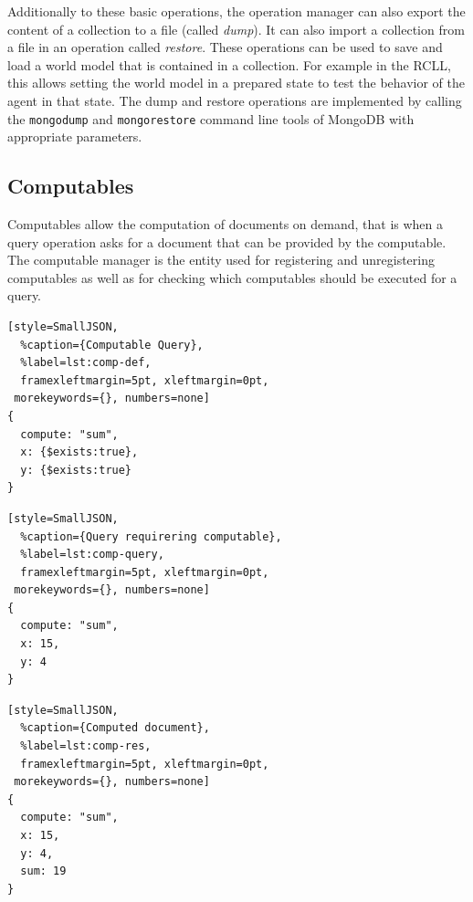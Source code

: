 Additionally to these basic operations, the operation manager can also
export the content of a collection to a file (called \emph{dump}). It
can also import a collection from a file in an operation called
\emph{restore}. These operations can be used to save and load a world
model that is contained in a collection. For example in the RCLL, this
allows setting the world model in a prepared state to test the
behavior of the agent in that state. The dump and restore operations
are implemented by calling the \texttt{mongodump} and
\texttt{mongorestore} command line tools of MongoDB with appropriate
parameters.

\subsection{Computables}
\label{sec:impl-computables}
Computables allow the computation of documents on demand, that is when
a query operation asks for a document that can be provided by the
computable. The computable manager is the entity used for registering
and unregistering computables as well as for checking which
computables should be executed for a query.\\
\begin{listing}
\addtocounter{lstlisting}{1}
\noindent
\begin{minipage}[b]{.30\textwidth}
\begin{lstlisting}[style=SmallJSON,
  %caption={Computable Query},
  %label=lst:comp-def,
  framexleftmargin=5pt, xleftmargin=0pt,
 morekeywords={}, numbers=none]
{
  compute: "sum",
  x: {$exists:true},
  y: {$exists:true}
}
\end{lstlisting}
\end{minipage}%
\hfill
\begin{minipage}[b]{.25\textwidth}
\begin{lstlisting}[style=SmallJSON,
  %caption={Query requirering computable},
  %label=lst:comp-query,
  framexleftmargin=5pt, xleftmargin=0pt,
 morekeywords={}, numbers=none]
{
  compute: "sum",
  x: 15,
  y: 4
}
\end{lstlisting}
\end{minipage}%
\hfill
\begin{minipage}[b]{.25\textwidth}
\begin{lstlisting}[style=SmallJSON,
  %caption={Computed document},
  %label=lst:comp-res,
  framexleftmargin=5pt, xleftmargin=0pt,
 morekeywords={}, numbers=none]
{
  compute: "sum",
  x: 15,
  y: 4,
  sum: 19
}
\end{lstlisting}
  \vspace{-0.3cm}
  \vspace{0.3cm}
\end{minipage}%
\caption{Queries and documents involved in a computable for addition}
\label{lst:comp}
\end{listing}
